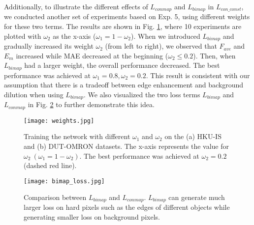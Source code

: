 \documentclass[review]{cvpr}
\begin{document}
Additionally, to illustrate the different effects of $L_{conmap}$ and $L_{bimap}$ in $L_{con\_const}$, we conducted another set of experiments based on Exp. 5, using different weights for these two terms. The results are shown in Fig. \ref{weight}, where 10 experiments are plotted with $\omega_2$ as the x-axis ($\omega_1=1- \omega_2$). When we introduced $L_{bimap}$ and gradually increased its weight $\omega_2$ (from left to right), we observed that $F_{ave}$  and $E_m$ increased while MAE decreased at the beginning ($\omega_2 \leq 0.2$). Then, when $L_{bimap}$ had a larger weight, the overall performance decreased. The best performance was achieved at $\omega_1=0.8,\omega_2=0.2$. This result is consistent with our assumption that there is a tradeoff between edge enhancement and background dilution when using $L_{bimap}$. We also visualized the two loss terms $L_{bimap}$ and $L_{conmap}$ in Fig. \ref{bimap_loss} to further demonstrate this idea. 



\begin{figure}[h]
\begin{center}
   \texttt{[image: weights.jpg]}
\end{center}
\vspace{-20pt}
\caption{Training the network with different $\omega_1$  and $\omega_2$ on the (a) HKU-IS and (b) DUT-OMRON datasets. The x-axis represents the value for $\omega_2 \ (\omega_1=1- \omega_2)$. The best performance was achieved at $\omega_2=0.2$ (dashed red line).}
\label{weight}
\vspace{-10pt}
\end{figure}

\begin{figure}[h!]
\begin{center}
   \texttt{[image: bimap\_loss.jpg]}
\end{center}
\vspace{-20pt}
\caption{Comparison between $L_{bimap}$ and $L_{conmap}$. $L_{bimap}$ can generate much larger loss on hard pixels such as the edges of different objects while generating smaller loss on background pixels.}
\label{bimap_loss}
\vspace{-10pt}
\end{figure}
\end{document}
